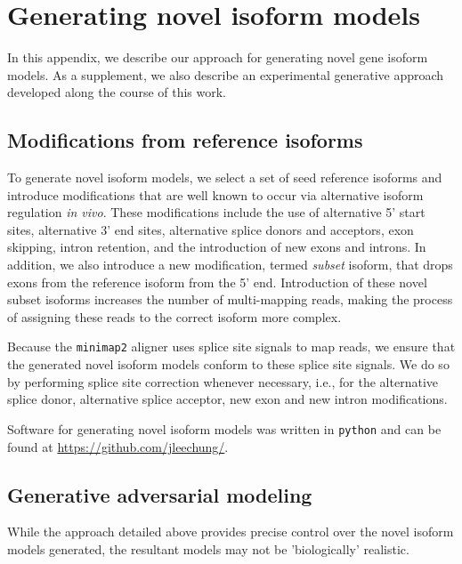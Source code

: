 
\chapter{Generating novel isoform models}

In this appendix, we describe our approach for generating novel gene isoform models. As a supplement, we also describe an experimental generative approach developed along the course of this work.   

\section{Modifications from reference isoforms}

To generate novel isoform models, we select a set of seed reference isoforms and introduce modifications that are well known to occur via alternative isoform regulation \textit{in vivo}. These modifications include the use of alternative 5' start sites, alternative 3' end sites, alternative splice donors and acceptors, exon skipping, intron retention, and the introduction of new exons and introns. In addition, we also introduce a new modification, termed \textit{subset} isoform, that drops exons from the reference isoform from the 5' end. Introduction of these novel subset isoforms increases the number of multi-mapping reads, making the process of assigning these reads to the correct isoform more complex. 


Because the \texttt{minimap2} aligner uses splice site signals to map reads, we ensure that the generated novel isoform models conform to these splice site signals. We do so by performing splice site correction whenever necessary, i.e., for the alternative splice donor, alternative splice acceptor, new exon and new intron modifications. 


Software for generating novel isoform models was written in \texttt{python} and can be found at \url{https://github.com/jleechung/}.

\section{Generative adversarial modeling}

While the approach detailed above provides precise control over the novel isoform models generated, the resultant models may not be 'biologically' realistic.  

